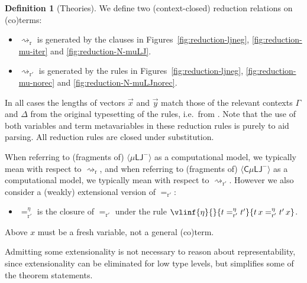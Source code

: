 \documentclass[10pt,a4paper]{amsart}
\theoremstyle{plain}
\theoremstyle{definition}
\newtheorem{definition}[definition]{Definition}
\theoremstyle{plain}
\theoremstyle{definition} %
\newcommand{\closure}[1]{\langle #1 \rangle}
\newcommand{\LJ}{\mathsf{LJ}}
\newcommand{\muLJ}{\mu\LJ}
\newcommand{\muLJneg}{\muLJ^-}
\newcommand{\circular}{\mathsf C}
\newcommand{\cmuLJ}{\circular\muLJ}
\newcommand{\cmuLJneg}{\cmuLJ^-}
\newcommand{\rewrite}{\rightsquigarrow}
\newcommand{\reduction}{\mathrm{r}}
\newcommand{\reduces}{\rewrite_{\reduction}}
\newcommand{\reductionnorec}{\mathrm{r}'}
\newcommand{\reducesnorec}{\rewrite_{\reductionnorec}}
\newcommand{\convertsnorec}{=_{\reductionnorec}}
\newcommand{\convertsnoreceta}{=_{\reductionnorec}^\eta} %
\newcommand{\extensional}{\eta} %
\begin{document}
\begin{definition}
    [Theories]
    We define two (context-closed) reduction relations on (co)terms: 
    \begin{itemize}
        \item $\reduces$ is generated by the clauses in Figures~\ref{fig:reduction-ljneg}, \ref{fig:reduction-mu-iter} and \ref{fig:reduction-N-muLJ}.
        \item $\reducesnorec$ is generated by the rules in Figures~\ref{fig:reduction-ljneg}, \ref{fig:reduction-mu-norec} and \ref{fig:reduction-N-muLJnorec}. 
    \end{itemize}
    In all cases the lengths of vectors $\vec x$ and $\vec y$ match those of the relevant contexts $\Gamma$ and $\Delta$ from the original typesetting of the rules, i.e.\ from .
    Note that the use of both variables and term metavariables in these reduction rules is purely to aid parsing. All reduction rules are closed under substitution.
    
    When referring to (fragments of) $\closure \muLJneg$ as a computational model, we typically mean with respect to $\reduces$, and when referring to (fragments of) $\closure \cmuLJneg$ as a computational model, we typically mean with respect to $\reducesnorec$. {However we also consider a (weakly) extensional version of  $\convertsnorec$:}
    \begin{itemize}
        \item $\convertsnoreceta$ is the closure of $\convertsnorec$ under the rule   $\vlinf{\extensional}{}{ t\convertsnoreceta t'}{t\, x \convertsnoreceta  t'\, x}$.
    \end{itemize}
    Above $x$ must be a fresh variable, not a general (co)term.
\end{definition}

Admitting some extensionality is not necessary to reason about representability, since extensionality can be eliminated for low type levels, but simplifies some of the theorem statements.
\end{document}
